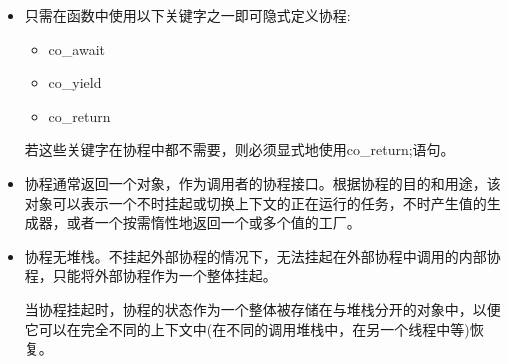 \begin{itemize}
\item 
只需在函数中使用以下关键字之一即可隐式定义协程:

\begin{itemize}
\item 
co\_await

\item 
co\_yield

\item 
co\_return
\end{itemize}

若这些关键字在协程中都不需要，则必须显式地使用co\_return;语句。

\item 
协程通常返回一个对象，作为调用者的协程接口。根据协程的目的和用途，该对象可以表示一个不时挂起或切换上下文的正在运行的任务，不时产生值的生成器，或者一个按需惰性地返回一个或多个值的工厂。

\item 
协程无堆栈。不挂起外部协程的情况下，无法挂起在外部协程中调用的内部协程，只能将外部协程作为一个整体挂起。

当协程挂起时，协程的状态作为一个整体被存储在与堆栈分开的对象中，以便它可以在完全不同的上下文中(在不同的调用堆栈中，在另一个线程中等)恢复。
\end{itemize}












